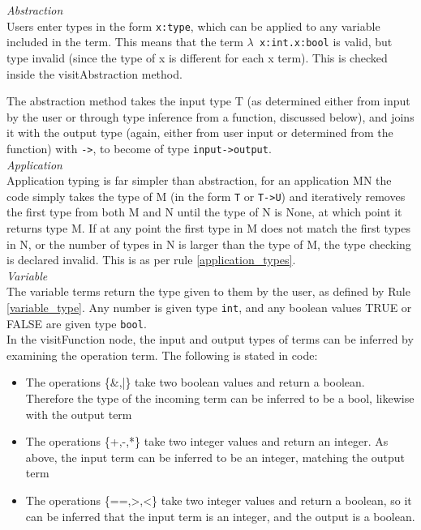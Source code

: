 \documentclass[a4paper,12pt]{report}
\begin{document}
\textit{Abstraction}\\
Users enter types in the form \texttt{x:type}, which can be applied to any variable included in the term. This means that the term \texttt{$\lambda$ x:int.x:bool} is valid, but type invalid (since the type of x is different for each x term). This is checked inside the visitAbstraction method.

The abstraction method takes the input type T (as determined either from input by the user or through type inference from a function, discussed below), and joins it with the output type (again, either from user input or determined from the function) with \texttt{->}, to become of type \texttt{input->output}.\\

\textit{Application}\\
Application typing is far simpler than abstraction, for an application MN the code simply takes the type of M (in the form \texttt{T} or \texttt{T->U}) and iteratively removes the first type from both M and N until the type of N is None, at which point it returns type M. If at any point the first type in M does not match the first types in N, or the number of types in N is larger than the type of M, the type checking is declared invalid. This is as per rule \ref{application_types}.\\

\textit{Variable}\\
The variable terms return the type given to them by the user, as defined by Rule \ref{variable_type}. Any number is given type \texttt{int}, and any boolean values TRUE or FALSE are given type \texttt{bool}.\\

In the visitFunction node, the input and output types of terms can be inferred by examining the operation term. The following is stated in code:

\begin{itemize}
	\item The operations \{\&,|\} take two boolean values and return a boolean. Therefore the type of the incoming term can be inferred to be a bool, likewise with the output term
	\item The operations \{+,-,*\} take two integer values and return an integer. As above, the input term can be inferred to be an integer, matching the output term
	\item The operations \{==,>,<\} take two integer values and return a boolean, so it can be inferred that the input term is an integer, and the output is a boolean. 
\end{itemize}
\end{document}
